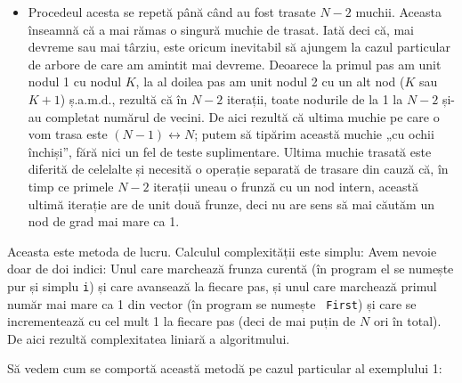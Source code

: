 \begin{itemize}
\item Procedeul acesta se repetă până când au fost trasate $N-2$
  muchii. Aceasta înseamnă că a mai rămas o singură muchie de trasat. Iată
  deci că, mai devreme sau mai târziu, este oricum inevitabil să ajungem la
  cazul particular de arbore de care am amintit mai devreme. Deoarece la
  primul pas am unit nodul 1 cu nodul $K$, la al doilea pas am unit nodul 2 cu
  un alt nod ($K$ sau $K+1$) ș.a.m.d., rezultă că în $N-2$ iterații, toate
  nodurile de la 1 la $N-2$ și-au completat numărul de vecini. De aici rezultă
  că ultima muchie pe care o vom trasa este $(N-1) \leftrightarrow N$; putem
  să tipărim această muchie „cu ochii închiși”, fără nici un fel de teste
  suplimentare. Ultima muchie trasată este diferită de celelalte și necesită o
  operație separată de trasare din cauză că, în timp ce primele $N-2$ iterații
  uneau o frunză cu un nod intern, această ultimă iterație are de unit două
  frunze, deci nu are sens să mai căutăm un nod de grad mai mare ca 1.
\end{itemize}

Aceasta este metoda de lucru. Calculul complexității este simplu: Avem nevoie
doar de doi indici: Unul care marchează frunza curentă (în program el se
numește pur și simplu {\tt i}) și care avansează la fiecare pas, și unul care
marchează primul număr mai mare ca 1 din vector (în program se numește {\tt
  First}) și care se incrementează cu cel mult 1 la fiecare pas (deci de mai
puțin de $N$ ori în total). De aici rezultă complexitatea liniară a
algoritmului.

Să vedem cum se comportă această metodă pe cazul particular al exemplului 1:

